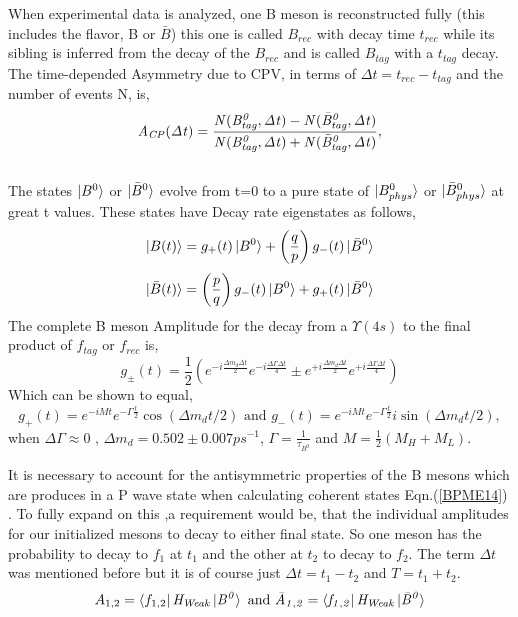 When experimental data is analyzed, one B meson is reconstructed fully (this includes the flavor, B or $\bar{B}$) this one is called $B_{rec}$ with decay time $t_{rec}$ while its sibling is inferred from the decay of the $B_{rec}$ and is called $B_{tag}$ with a $t_{tag}$ decay. The time-depended Asymmetry due to CPV, in terms of $\Delta{t} = t_{rec}-t_{tag}$ and the number of events N, is,
\begin{equation}\label{BPME6}
\it{A}_{CP}(\Delta t)= \frac{N(B^{0}_{tag},\Delta t)-N(\bar{B}^{0}_{tag},\Delta t)}{N(B^{0}_{tag},\Delta t)+N(\bar{B}^{0}_{tag},\Delta t)},
\end{equation}
\\

The states $\ket{B^{0}}$ or $\ket{\bar{B}^{0}}$ evolve from t=0 to a pure state of $\ket{B_{phys}^{0}}$ or $\ket{\bar{B}^{0}_{phys}}$ at great t values. 
These states have Decay rate eigenstates as follows,
\begin{equation}\label{BPME7}
\ket{B(t)}= g_+(t)\ket{B^0}+\left(\frac{q}{p}\right)g_{-}(t)\ket{\bar{B}^0}
\end{equation}
\begin{equation}\label{BPME8}
\ket{\bar{B}(t)}= \left(\frac{p}{q}\right)g_-(t)\ket{B^0}+g_{+}(t)\ket{\bar{B}^0}
\end{equation}
The complete B meson Amplitude for the decay from a $\Upsilon(4s)$ to the final product of $f_{tag}$ or $f_{rec}$ is,
\begin{equation}\label{BPME10}
 g_{\pm}(t)=\frac{1}{2}(e^{-i\frac{\Delta m_d \Delta t}{2}}e^{-i\frac{\Delta\Gamma \Delta t}{4}}\pm e^{+i\frac{\Delta m_d \Delta t}{2}}e^{+i\frac{\Delta\Gamma \Delta t}{4}})
\end{equation}
Which can be shown to equal,
\begin{equation}\label{BPME11}
g_{+}(t)=e^{-iMt}e^{-\Gamma\frac{t}{2}}\cos(\Delta m_d t/2) \mbox{ and }g_{-}(t)=e^{-iMt}e^{-\Gamma\frac{t}{2}}i\sin(\Delta m_d t/2),
\end{equation}
when $\Delta\Gamma \approx 0 \mbox{ , }\Delta m_d = 0.502 \pm 0.007 ps^{-1}$, $\Gamma = \frac{1}{\tau_{B^0}}$ and $M=\frac{1}{2}(M_H+M_L)$.

It is necessary to account for the antisymmetric properties of the B mesons which are produces in a P wave state when calculating coherent states Eqn.(\ref{BPME14}) \cite{B10}. To fully expand on this ,a requirement would be, that the individual amplitudes for our initialized mesons to decay to either final state. So one meson has the probability to decay to $f_1$ at $t_1$ and the other at $t_2$ to decay to $f_2$. The term $\Delta t$ was mentioned before but it is of course just $\Delta t = t_1 -t_2$ and $T= t_1 +t_2$.
\begin{equation}\label{BPME12}
A_{1,2}=\bra{f_{1,2}}\it{H_{Weak}}\ket{B^{0}} \mbox{ and } \bar{A}_{1,2}=\bra{f_{1,2}}\it{H_{Weak}}\ket{\bar{B}^{0}}
\end{equation}

